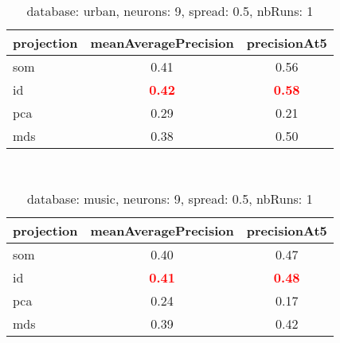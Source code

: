   
 
  
  
\begin{table} 
\begin{center} 
\ 
 \setlength{\tabcolsep}{.16667em} 
\begin{tabular}{lcc} 
projection & meanAveragePrecision & precisionAt5 \\ 
\hline 
som & 0.41 & 0.56 \\ 
id & \textbf{\textcolor{red}{0.42}} & \textbf{\textcolor{red}{0.58}} \\ 
pca & 0.29 & 0.21 \\ 
mds & 0.38 & 0.50 \\ 
\end{tabular} 
\end{center} 
\caption{database: urban, neurons: 9, spread: 0.5, nbRuns: 1} 
\label{daurNe9Sp0.5Nbru1} 
\end{table} 
 
  
\begin{table} 
\begin{center} 
\ 
 \setlength{\tabcolsep}{.16667em} 
\begin{tabular}{lcc} 
projection & meanAveragePrecision & precisionAt5 \\ 
\hline 
som & 0.40 & 0.47 \\ 
id & \textbf{\textcolor{red}{0.41}} & \textbf{\textcolor{red}{0.48}} \\ 
pca & 0.24 & 0.17 \\ 
mds & 0.39 & 0.42 \\ 
\end{tabular} 
\end{center} 
\caption{database: music, neurons: 9, spread: 0.5, nbRuns: 1} 
\label{damuNe9Sp0.5Nbru1} 
\end{table} 
 
